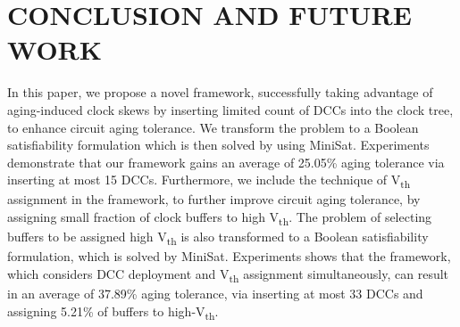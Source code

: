 \section{CONCLUSION AND FUTURE WORK}
\label{sec:conclude}
In this paper, we propose a novel framework, successfully taking advantage of aging-induced clock skews by inserting limited count of DCCs into the clock tree, to enhance circuit aging tolerance. We transform the problem to a Boolean satisfiability formulation which is then solved by using MiniSat. Experiments demonstrate that our framework gains an average of 25.05\% aging tolerance via inserting at most 15 DCCs. Furthermore, we include the technique of V\textsubscript{th} assignment in the framework, to further improve circuit aging tolerance, by assigning small fraction of clock buffers to high V\textsubscript{th}. The problem of selecting buffers to be assigned high V\textsubscript{th} is also transformed to a Boolean satisfiability formulation, which is solved by MiniSat. Experiments shows that the framework, which considers DCC deployment and V\textsubscript{th} assignment simultaneously, can result in an average of 37.89\% aging tolerance, via inserting at most 33 DCCs and assigning 5.21\% of buffers to high-V\textsubscript{th}.


